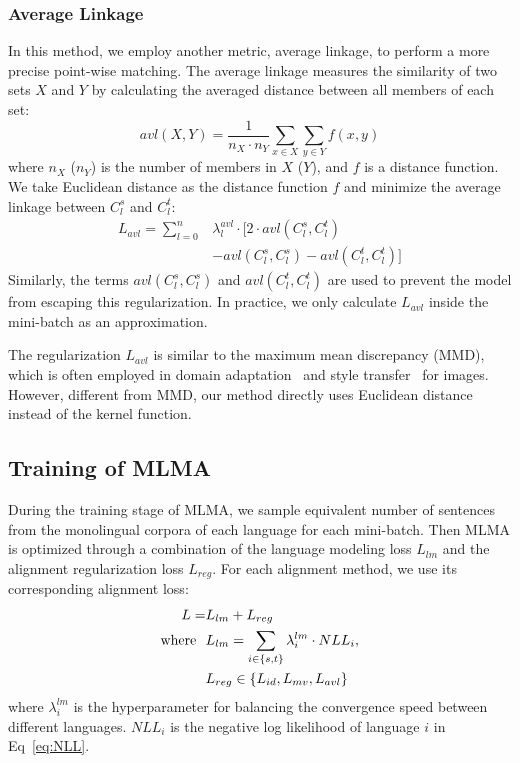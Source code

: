 \documentclass[11pt,a4paper]{article}
\begin{document}
	\subsubsection*{Average Linkage}
	In this method, we employ another metric, average linkage, to perform a more precise point-wise matching. The average linkage measures the similarity of two sets $X$ and $Y$ by calculating the averaged distance between all members of each set:
	\begin{equation*}
	avl(X, Y) = \dfrac{1}{n_{X} \cdot n_{Y}} \sum_{x \in X} \sum_{y \in Y} f(x, y)
	\end{equation*}
	where $n_X$ ($n_Y$) is the number of members in $X$ ($Y$), and $f$ is a distance function. We take Euclidean distance as the distance function $f$ and minimize the average linkage between $C_l^s$ and $C_l^t$:
	\begin{equation*}
	\begin{aligned}
	L_{avl} = \sum_{l=0}^n & \lambda_{l}^{avl} \cdot [2 \cdot avl(C_l^s, C_l^t) \\
	& - avl(C_l^s, C_l^s)  - avl(C_l^t, C_l^t)]
	\end{aligned}
	\end{equation*}
	Similarly, the terms $avl(C_l^s, C_l^s)$ and $avl(C_l^t, C_l^t)$ are used to prevent the model from escaping this regularization. In practice, we only calculate $L_{avl}$ inside the mini-batch as an approximation.
	
	The regularization $L_{avl}$ is similar to the maximum mean discrepancy (MMD), which is often employed in domain adaptation~\cite{tzeng2014deep,long2015learning} and style transfer~\cite{li2017demystifying} for images. However, different from MMD, our method directly uses Euclidean distance instead of the kernel function.
	
	\subsection{Training of MLMA}
	During the training stage of MLMA, we sample equivalent number of sentences from the monolingual corpora of each language for each mini-batch. Then MLMA is optimized through a combination of the language modeling loss $L_{lm}$ and the alignment regularization loss $L_{reg}$. For each alignment method, we use its corresponding alignment loss:
	\begin{equation*}
	\begin{aligned}
    L = &L_{lm} + L_{reg} \\
	{\rm where}\ \ &L_{lm} =  \sum_{i \in \{s, t\}} \lambda_{i}^{lm} \cdot NLL_i, \\
	&L_{reg} \in \{L_{id}, L_{mv}, L_{avl}\}
	\end{aligned}
	\end{equation*}
	where $\lambda_{i}^{lm}$ is the hyperparameter for balancing the convergence speed between different languages. $NLL_i$ is the negative log likelihood of language $i$ in Eq~\eqref{eq:NLL}.
	
\end{document}
